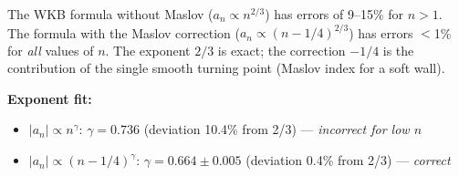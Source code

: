 \documentclass[10pt,a4paper]{article}
\begin{document}
The WKB formula without Maslov ($a_n \propto n^{2/3}$) has errors of 9--15\% for $n > 1$. The formula with the Maslov correction ($a_n \propto (n-1/4)^{2/3}$) has errors $<$1\% for \textit{all} values of $n$. The exponent $2/3$ is exact; the correction $-1/4$ is the contribution of the single smooth turning point (Maslov index for a soft wall).

\textbf{Exponent fit:}
\begin{itemize}
\item $|a_n| \propto n^\gamma$: $\gamma = 0.736$ (deviation 10.4\% from 2/3) --- \textit{incorrect for low $n$}
\item $|a_n| \propto (n-1/4)^\gamma$: $\gamma = 0.664 \pm 0.005$ (deviation 0.4\% from 2/3) --- \textit{correct}
\end{itemize}
\end{document}
